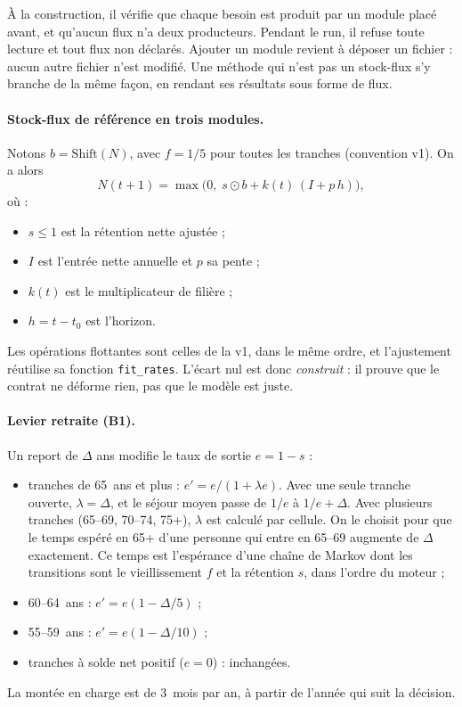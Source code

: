 \documentclass[11pt]{article}
\begin{document}
À la construction, il vérifie que chaque besoin est produit par un module placé avant, et qu'aucun
flux n'a deux producteurs. Pendant le run, il refuse toute lecture et tout flux non déclarés. Ajouter
un module revient à déposer un fichier : aucun autre fichier n'est modifié. Une méthode qui n'est pas
un stock-flux s'y branche de la même façon, en rendant ses résultats sous forme de flux.

\paragraph{Stock-flux de référence en trois modules.} Notons $b = \text{Shift}(N)$, avec $f = 1/5$
pour toutes les tranches (convention v1). On a alors
\begin{equation}
N(t+1) = \max\!\bigl(0,\; s\odot b + k(t)\,(I + p\,h)\bigr),
\end{equation}
où :
\begin{itemize}
  \item $s \le 1$ est la rétention nette ajustée ;
  \item $I$ est l'entrée nette annuelle et $p$ sa pente ;
  \item $k(t)$ est le multiplicateur de filière ;
  \item $h = t - t_0$ est l'horizon.
\end{itemize}
Les opérations flottantes sont celles de la v1, dans le même ordre, et l'ajustement réutilise sa
fonction \texttt{fit\_rates}. L'écart nul est donc \emph{construit} : il prouve que le contrat ne
déforme rien, pas que le modèle est juste.

\paragraph{Levier retraite (B1).} Un report de $\Delta$ ans modifie le taux de sortie $e = 1-s$ :
\begin{itemize}
  \item tranches de 65~ans et plus : $e' = e/(1+\lambda e)$. Avec une seule tranche ouverte,
        $\lambda = \Delta$, et le séjour moyen passe de $1/e$ à $1/e + \Delta$. Avec plusieurs
        tranches (65--69, 70--74, 75+), $\lambda$ est calculé par cellule. On le choisit pour que le
        temps espéré en 65+ d'une personne qui entre en 65--69 augmente de $\Delta$ exactement. Ce
        temps est l'espérance d'une chaîne de Markov dont les transitions sont le vieillissement $f$ et
        la rétention $s$, dans l'ordre du moteur ;
  \item 60--64~ans : $e' = e(1-\Delta/5)$ ;
  \item 55--59~ans : $e' = e(1-\Delta/10)$ ;
  \item tranches à solde net positif ($e = 0$) : inchangées.
\end{itemize}
La montée en charge est de 3\suppose{}~mois par an, à partir de l'année qui suit la décision.
\end{document}
